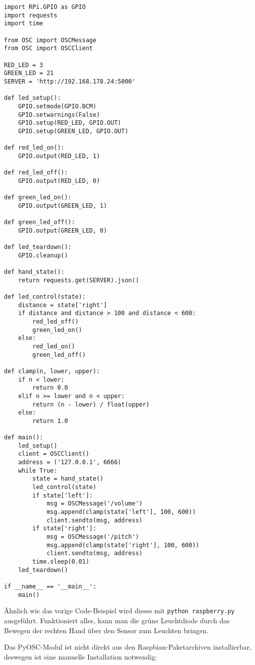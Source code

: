 \documentclass[a4paper, fontsize=12pt, toc=bibliographynumbered]{scrreprt}
\newcommand{\mono}[1]{\texttt{#1}}
\begin{document}
\begin{verbatim}
import RPi.GPIO as GPIO
import requests
import time

from OSC import OSCMessage
from OSC import OSCClient

RED_LED = 3
GREEN_LED = 21
SERVER = 'http://192.168.178.24:5000'

def led_setup():
    GPIO.setmode(GPIO.BCM)
    GPIO.setwarnings(False)
    GPIO.setup(RED_LED, GPIO.OUT)
    GPIO.setup(GREEN_LED, GPIO.OUT)

def red_led_on():
    GPIO.output(RED_LED, 1)

def red_led_off():
    GPIO.output(RED_LED, 0)

def green_led_on():
    GPIO.output(GREEN_LED, 1)

def green_led_off():
    GPIO.output(GREEN_LED, 0)

def led_teardown():
    GPIO.cleanup()

def hand_state():
    return requests.get(SERVER).json()

def led_control(state):
    distance = state['right']
    if distance and distance > 100 and distance < 600:
        red_led_off()
        green_led_on()
    else:
        red_led_on()
        green_led_off()

def clamp(n, lower, upper):
    if n < lower:
        return 0.0
    elif n >= lower and n < upper:
        return (n - lower) / float(upper)
    else:
        return 1.0

def main():
    led_setup()
    client = OSCClient()
    address = ('127.0.0.1', 6666)
    while True:
        state = hand_state()
        led_control(state)
        if state['left']:
            msg = OSCMessage('/volume')
            msg.append(clamp(state['left'], 100, 600))
            client.sendto(msg, address)
        if state['right']:
            msg = OSCMessage('/pitch')
            msg.append(clamp(state['right'], 100, 600))
            client.sendto(msg, address)
        time.sleep(0.01)
    led_teardown()

if __name__ == '__main__':
    main()
\end{verbatim}

Ähnlich wie das vorige Code-Beispiel wird dieses mit \mono{python
  raspberry.py} ausgeführt.  Funktioniert alles, kann man die grüne
Leuchtdiode durch das Bewegen der rechten Hand über den Sensor zum
Leuchten bringen.

Das PyOSC-Modul ist nicht direkt aus den Raspbian-Paketarchiven
installierbar, deswegen ist eine manuelle Installation notwendig:
\end{document}
